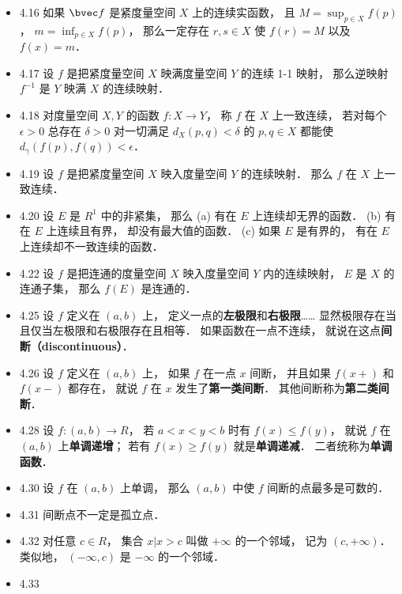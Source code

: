 \begin{itemize}
\item 4.16 如果 $\bvec f$ 是紧度量空间 $X$ 上的连续实函数， 且 $M = \sup_{p\in X} f(p)$， $m=\inf_{p\in X} f(p)$， 那么一定存在 $r,s\in X$ 使 $f(r)=M$ 以及 $f(x)=m$．

\item 4.17 设 $f$ 是把紧度量空间 $X$ 映满度量空间 $Y$ 的连续 1-1 映射， 那么逆映射 $f^{-1}$ 是 $Y$ 映满 $X$ 的连续映射．

\item 4.18 对度量空间 $X,Y$ 的函数 $f:X\to Y$， 称 $f$ 在 $X$ 上一致连续， 若对每个 $\epsilon>0$ 总存在 $\delta >0$ 对一切满足 $d_X(p,q)<\delta$ 的 $p,q\in X$ 都能使 $d_\gamma(f(p),f(q))<\epsilon$．

\item 4.19 设 $f$ 是把紧度量空间 $X$ 映入度量空间 $Y$ 的连续映射． 那么 $f$ 在 $X$ 上一致连续．

\item 4.20 设 $E$ 是 $R^1$ 中的非紧集， 那么 (a) 有在 $E$ 上连续却无界的函数． (b) 有在 $E$ 上连续且有界， 却没有最大值的函数． (c) 如果 $E$ 是有界的， 有在 $E$ 上连续却不一致连续的函数．

\item 4.22 设 $f$ 是把连通的度量空间 $X$ 映入度量空间 $Y$ 内的连续映射， $E$ 是 $X$ 的连通子集， 那么 $f(E)$ 是连通的．

\item 4.25 设 $f$ 定义在 $(a,b)$ 上， 定义一点的\textbf{左极限}和\textbf{右极限}…… 显然极限存在当且仅当左极限和右极限存在且相等． 如果函数在一点不连续， 就说在这点\textbf{间断（discontinuous）}．

\item 4.26 设 $f$ 定义在 $(a,b)$ 上， 如果 $f$ 在一点 $x$ 间断， 并且如果 $f(x+)$ 和 $f(x-)$ 都存在， 就说 $f$ 在 $x$ 发生了\textbf{第一类间断}． 其他间断称为\textbf{第二类间断}．

\item 4.28 设 $f:(a,b)\to R$， 若 $a<x<y<b$ 时有 $f(x)\leqslant f(y)$， 就说 $f$ 在 $(a,b)$ 上\textbf{单调递增}； 若有 $f(x)\geqslant f(y)$ 就是\textbf{单调递减}． 二者统称为\textbf{单调函数}．

\item 4.30 设 $f$ 在 $(a,b)$ 上单调， 那么 $(a,b)$ 中使 $f$ 间断的点最多是可数的．

\item 4.31 间断点不一定是孤立点． 

\item 4.32 对任意 $c\in R$， 集合 ${x|x>c}$ 叫做 $+\infty$ 的一个邻域， 记为 $(c,+\infty)$． 类似地， $(-\infty, c)$ 是 $-\infty$ 的一个邻域．

\item 4.33 
\end{itemize}


